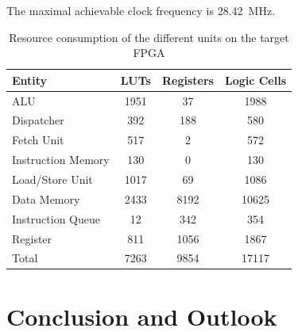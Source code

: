 \documentclass[conference]{IEEEtran}
\begin{document}
The maximal achievable clock frequency is \SI{28.42}{\MHz}. %
\begin{table} [h]
	\caption{Resource consumption of the different units on the target FPGA}
	\centering
	\begin{tabular}{l c c c}
			Entity & LUTs & Registers & Logic Cells \\
		\midrule
			ALU & 1951 & 37 & 1988 \\
			Dispatcher & 392 & 188 & 580 \\
			Fetch Unit & 517 & 2 & 572 \\
			Instruction Memory & 130 & 0 & 130 \\
			Load/Store Unit & 1017 & 69 & 1086 \\
			Data Memory & 2433 & 8192 & 10625 \\
			Instruction Queue & 12 & 342 & 354 \\
			Register & 811 & 1056 & 1867 \\
		\midrule
			Total & 7263 & 9854 & 17117 \\
	\end{tabular}
	\label{tab:results}
\end{table}



\section{Conclusion and Outlook} \label{sec:conclusion}



\cite{HP}


\printbibliography
\end{document}
